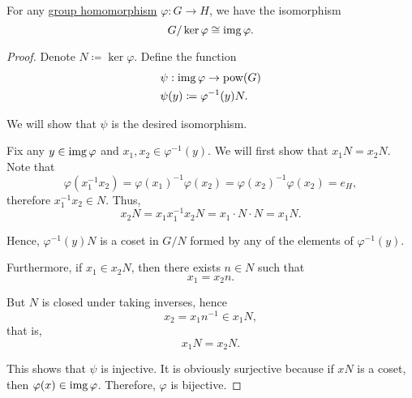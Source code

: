 \begin{theorem}\label{thm:homomorphism_theorem_for_groups}
  For any \hyperref[def:group/homomorphism]{group homomorphism} \( \varphi: G \to H \), we have the isomorphism
  \begin{equation*}
    G / \ker \varphi \cong \operatorname{img} \varphi.
  \end{equation*}
\end{theorem}
\begin{proof}
  Denote \( N \coloneqq \ker \varphi \). Define the function
  \begin{align*}
    &\psi: \operatorname{img} \varphi \to \operatorname{pow}(G) \\
    &\psi(y) \coloneqq \varphi^{-1}(y) N.
  \end{align*}

  We will show that \( \psi \) is the desired isomorphism.

  Fix any \( y \in \operatorname{img} \varphi \) and \( x_1, x_2 \in \varphi^{-1}(y) \). We will first show that \( x_1 N = x_2 N \). Note that
  \begin{equation*}
    \varphi(x_1^{-1} x_2)
    =
    \varphi(x_1)^{-1} \varphi(x_2)
    =
    \varphi(x_2)^{-1} \varphi(x_2)
    =
    e_H,
  \end{equation*}
  therefore \( x_1^{-1} x_2 \in N \). Thus,
  \begin{equation*}
    x_2 N = x_1 x_1^{-1} x_2 N = x_1 \cdot N \cdot N = x_1 N.
  \end{equation*}

  Hence, \( \varphi^{-1}(y) N \) is a coset in \( G / N \) formed by any of the elements of \( \varphi^{-1}(y) \).

  Furthermore, if \( x_1 \in x_2 N \), then there exists \( n \in N \) such that
  \begin{equation*}
    x_1 = x_2 n.
  \end{equation*}

  But \( N \) is closed under taking inverses, hence
  \begin{equation*}
    x_2 = x_1 n^{-1} \in x_1 N,
  \end{equation*}
  that is,
  \begin{equation*}
    x_1 N = x_2 N.
  \end{equation*}

  This shows that \( \psi \) is injective. It is obviously surjective because if \( x N \) is a coset, then \( \varphi(x) \in \operatorname{img} \varphi \). Therefore, \( \varphi \) is bijective.


\end{proof}
